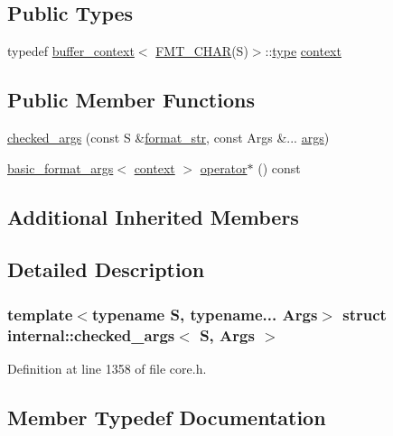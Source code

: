 \subsection*{Public Types}
\begin{DoxyCompactItemize}
\item 
typedef \hyperlink{structbuffer__context}{buffer\+\_\+context}$<$ \hyperlink{format_8h_a719e8ab6760f525f663de75c59a68ef3}{F\+M\+T\+\_\+\+C\+H\+AR}(S)$>$\+::\hyperlink{namespaceinternal_a8661864098ac0acff9a6dd7e66f59038}{type} \hyperlink{structinternal_1_1checked__args_a657828c977dfe543d031ac4323924e3d}{context}
\end{DoxyCompactItemize}
\subsection*{Public Member Functions}
\begin{DoxyCompactItemize}
\item 
\hyperlink{structinternal_1_1checked__args_aed0a5d00ad7384d8646e7794678fbc9c}{checked\+\_\+args} (const S \&\hyperlink{format_8h_aa2b402011ee0619f2158f13e0827e585}{format\+\_\+str}, const Args \&... \hyperlink{printf_8h_a47047b7b28fd1342eef756b79c778580}{args})
\item 
\hyperlink{classbasic__format__args}{basic\+\_\+format\+\_\+args}$<$ \hyperlink{structinternal_1_1checked__args_a657828c977dfe543d031ac4323924e3d}{context} $>$ \hyperlink{structinternal_1_1checked__args_a972845a4996b1931df4ae50dbfb9f4cf}{operator$\ast$} () const
\end{DoxyCompactItemize}
\subsection*{Additional Inherited Members}


\subsection{Detailed Description}
\subsubsection*{template$<$typename S, typename... Args$>$\newline
struct internal\+::checked\+\_\+args$<$ S, Args $>$}



Definition at line 1358 of file core.\+h.



\subsection{Member Typedef Documentation}
\mbox{\label{structinternal_1_1checked__args_a657828c977dfe543d031ac4323924e3d}} 
